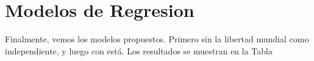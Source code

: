 
\section{Modelos de Regresion}

Finalmente, vemos los modelos propuestos. Primero sin la libertad mundial como independiente, y luego con está. Los resultados se muestran en la Tabla %


